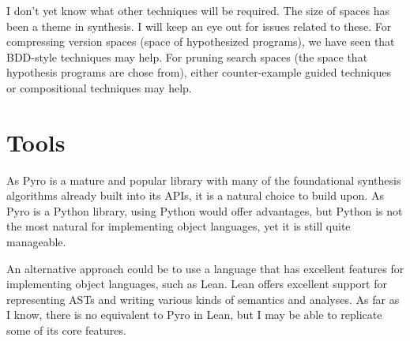 \documentclass[runningheads]{llncs}
\begin{document}
I don't yet know what other techniques will be required. The size of spaces has been a theme in synthesis.
I will keep an eye out for issues related to these. 
For compressing version spaces (space of hypothesized programs), we have seen that BDD-style techniques may help.
For pruning search spaces (the space that hypothesis programs are chose from), 
either counter-example guided techniques or compositional techniques may help. 

\section{Tools}
As Pyro is a mature and popular library with many of the foundational synthesis algorithms already built into its APIs, 
it is a natural choice to build upon.
As Pyro is a Python library, using Python would offer advantages, 
but Python is not the most natural for implementing object languages, yet it is still quite manageable. 

An alternative approach could be to use a language that has excellent features for implementing object languages, 
such as Lean.
Lean offers excellent support for representing ASTs and writing various kinds of semantics and analyses.
As far as I know, there is no equivalent to Pyro in Lean, but I may be able to replicate some of its core features.
\end{document}
